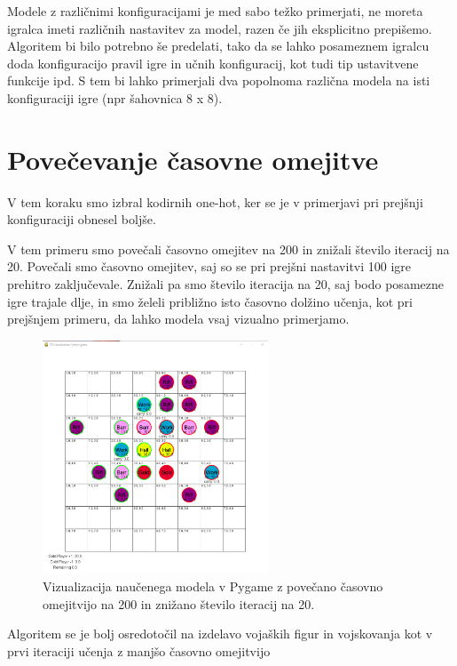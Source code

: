 \documentclass[a4paper, 12pt]{book}
\begin{document}
Modele z različnimi konfiguracijami je med sabo težko primerjati, ne moreta igralca imeti različnih nastavitev za model, razen če jih eksplicitno prepišemo.
Algoritem bi bilo potrebno še predelati, tako da se lahko posameznem igralcu doda konfiguracijo pravil igre in učnih konfiguracij, kot tudi tip ustavitvene funkcije ipd.
S tem bi lahko primerjali dva popolnoma različna modela na isti konfiguraciji igre (npr šahovnica 8 x 8).

\section{Povečevanje časovne omejitve}
\label{resultSecond}
V tem koraku smo izbral kodirnih one-hot, ker se je v primerjavi pri prejšnji konfiguraciji obnesel boljše.

V tem primeru smo povečali časovno omejitev na 200 in znižali število iteracij na 20.
Povečali smo časovno omejitev, saj so se pri prejšni nastavitvi 100 igre prehitro zaključevale.
Znižali pa smo število iteracija na 20, saj bodo posamezne igre trajale dlje, in smo želeli približno isto časovno dolžino učenja, kot pri prejšnjem primeru, da lahko modela vsaj vizualno primerjamo.

\begin{figure}[h]
	\begin{center}
		\includegraphics[width=0.6\textwidth]{photos/second-2018-11-12.pdf}
	\end{center}
	\caption{Vizualizacija naučenega modela v Pygame z povečano časovno omejitvijo  na 200 in znižano število iteracij na 20.}
	\label{vizualizacijaRezultatov200timeout20Iters}
\end{figure}

Algoritem se je bolj osredotočil na izdelavo vojaških figur in vojskovanja kot v prvi iteraciji učenja z manjšo časovno omejitvijo
\end{document}

